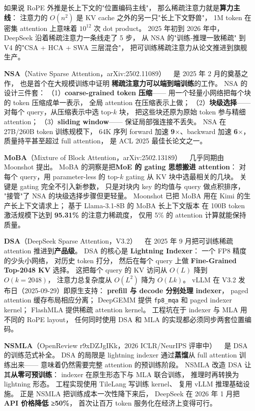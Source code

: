 如果说 RoPE 外推是长上下文的"位置编码主线"，
那么稀疏注意力就是\textbf{算力主线}：
注意力的 $O(n^2)$ 是 KV cache 之外的另一只"长上下文野兽"，
1M token 在密集 attention 上意味着 $10^{12}$ 次 dot product。
2025 年初到 2026 年中，DeepSeek 沿着稀疏注意力一条线走了 5 步，
从 NSA 的"训练-推理一致稀疏"
到 V4 的"CSA + HCA + SWA 三层混合"，
把可训练稀疏注意力从论文推进到旗舰生产。

\textbf{NSA}（Native Sparse Attention，arXiv:2502.11089）
~\cite{nsa2025} 是 2025 年 2 月的奠基之作，
也是首个在大规模训练中证明
\textbf{稀疏注意力可以端到端训练}的工作。
NSA 的设计三件套：
（1）\textbf{coarse-grained token 压缩}——
用一个轻量小网络把每个块的 token 压缩成单一表示，
全局 attention 在压缩表示上做；
（2）\textbf{块级选择}——
对每个 query，从压缩表示中选 top-$k$ 块，
把这些块还原为原始 token 参与精细 attention；
（3）\textbf{sliding window}——
保证局部强连接不丢失。
NSA 在 27B/260B token 训练规模下，
64K 序列 forward 加速 \textbf{9$\times$}、backward 加速 \textbf{6$\times$}，
质量持平甚至超过 full attention，
是 ACL 2025 最佳长论文之一。

\textbf{MoBA}（Mixture of Block Attention，arXiv:2502.13189）
~\cite{moba2025} 几乎同期由 Moonshot 提出。
MoBA 的洞察是把\textbf{MoE 的 gating 思想搬进 attention}：
对每个 query，用 parameter-less 的 top-$k$ gating
从 KV 块中选最相关的几块。
关键是 gating 完全不引入新参数，
只是对块内 key 的均值与 query 做点积排序，
"接管"了 NSA 的块级选择步骤但更轻量。
Moonshot 已把 MoBA 用在 Kimi 的生产长上下文请求上；
基于 Llama-3.1-8B 的 MoBA 长上下文版本
在 100B token 激活规模下达到 \textbf{95.31\%} 的注意力稀疏度，
仅用 5\% 的 attention 计算就能保持质量。

\textbf{DSA}（DeepSeek Sparse Attention，V3.2）
~\cite{deepseekv32dsa} 在 2025 年 9 月把可训练稀疏 attention
推进到\textbf{产品级}。
DSA 的核心是 \textbf{Lightning Indexer}：
一个 FP8 精度的少头小网络，
对历史 token 打分，
然后在每个 query 上做 \textbf{Fine-Grained Top-2048 KV} 选择。
这把每个 query 的 KV 访问从 $O(L)$ 降到 $O(k=2048)$，
注意力总复杂度从 $O(L^2)$ 降为 $O(Lk)$。
vLLM 在 V3.2 发布日（2025-09-29）即原生支持：
\textbf{prefill 与 decode 分别处理 indexer}，
paged attention 缓存布局相应分离；
DeepGEMM 提供 \texttt{fp8\_mqa} 和 paged indexer kernel；
FlashMLA 提供稀疏 attention kernel。
工程坑在于 indexer 与 MLA 用不同的 RoPE layout，
任何同时使用 DSA 和 MLA 的实现都必须同步两套位置编码。

\textbf{NSMLA}（OpenReview r9xDZJgIKk，2026 ICLR/NeurIPS 评审中）
~\cite{nsmla2026} 是 DSA 的训练范式补全。
DSA 的局限是 lightning indexer 通过\textbf{蒸馏}从 full attention 训练出来——
意味着仍然需要完整 attention 的预训练阶段。
NSMLA 改造 DSA 让其\textbf{从零可预训练}：
indexer 在原生形态下与 MLA 联合训练，
推理时再转换为 lightning 形态。
工程实现使用 TileLang 写训练 kernel、
复用 vLLM 推理基础设施。
正是 NSMLA 把训练成本一次性降下来后，
DeepSeek 在 2026 年 1 月把 \textbf{API 价格降低 ≥50\%}，
首次让百万 token 服务化在经济上变得可行。

